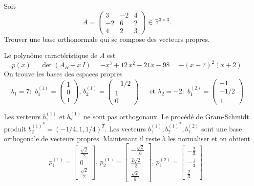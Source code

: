 \begin{example}
  \label{exe:17}
  Soit 
  \begin{displaymath}
    A  =
    \begin{pmatrix}
      3 & -2 & 4\\-2 & 6 & 2\\4 & 2 & 3
    \end{pmatrix} ∈ ℝ^{ 3 ×3}.
  \end{displaymath}
Trouver une base orthonormale qui se compose des vecteurs propres. 


\bigskip 

Le polynôme caractéristique de $A$ est 
\begin{displaymath}
  p(x) = \det(A_B - x\, I) =  -x^3 + 12\, x^2 -21 x - 98 = -(x-7)^2(x+2)
\end{displaymath}
On trouve les bases des espaces propres
\begin{displaymath}
  \lambda_1 = 7: \, \,
b_1^{(1)} = \begin{pmatrix}
    1 \\ 0 \\ 1 
  \end{pmatrix}, \, 
b_2^{(1)} =   \begin{pmatrix}
    -1/2\\1\\0
  \end{pmatrix} \, \quad \text{ et } 
  \lambda_2 = -2: \, \, 
  b_1^{(2)} = 
  \begin{pmatrix}
    -1 \\ -1/2 \\1
  \end{pmatrix}  
\end{displaymath}

Les vecteurs $b_1^{(1)}$
et $b_2^{(1)}$
ne sont pas orthogonaux.  Le procédé de Gram-Schmidt produit
${b_2^{(1)}}^* = (-1/4,1,1/4)^T$.
Les vecteurs $b_1^{(1)},{b_2^{(1)}}^*,b_1^{(2)}$
sont une base orthogonale de vecteurs propres. Maintenant il reste à
les normaliser et on obtient
\begin{displaymath}
p_1^{(1)} = 
\left[\begin{matrix}\frac{\sqrt{2}}{2}\\0\\\frac{\sqrt{2}}{2}\end{matrix}\right], \, 
{p_2^{(1)}} = \left[\begin{matrix}- \frac{\sqrt{2}}{6}\\\frac{2 \sqrt{2}}{3}\\\frac{\sqrt{2}}{6}\end{matrix}\right], \, 
p_1^{(2)} = \left[\begin{matrix}-\frac{2}{3}\\-\frac{1}{3}\\\frac{2}{3}\end{matrix}\right]. 
\end{displaymath}

\end{example}

